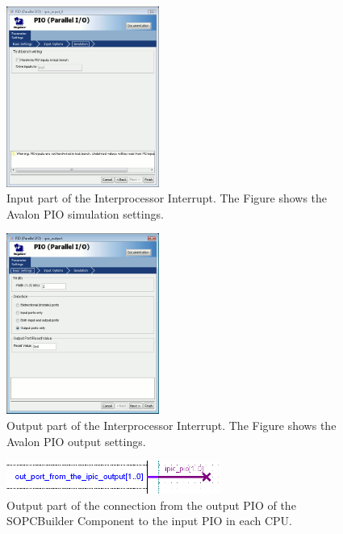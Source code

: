 \begin{figure}
  \begin{center}
    \includegraphics[width=5cm, bb=0 0 518 613]{images/IPIC_PIO_in_dialogbox_simulation.png}
  \end{center}
  \caption{Input part of the Interprocessor Interrupt. 
    The Figure shows the Avalon PIO simulation settings.}
  \label{fig:IPIC-input-simulation}
\end{figure}

\begin{figure}
  \begin{center}
    \includegraphics[width=5cm, bb=0 0 518 614]{images/IPIC_PIO_out_dialogbox.png}
  \end{center}
  \caption{Output part of the Interprocessor Interrupt. 
    The Figure shows the Avalon PIO output settings.}
  \label{fig:IPIC-output}
\end{figure}

\begin{figure}
  \begin{center}
    \includegraphics[width=7cm, bb=0 0 504 78]{images/IPIC_PIO_out_2cpu.png}
  \end{center}
  \caption{Output part of the connection from
    the output PIO of the SOPCBuilder Component to the input PIO in each
    CPU.}
  \label{fig:IPIC-out-2cpu} 
\end{figure}

